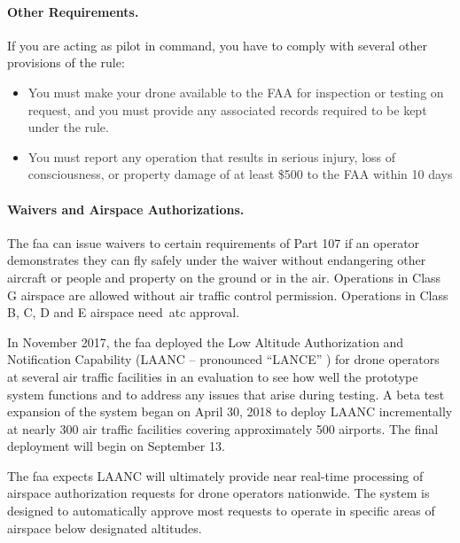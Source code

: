 \paragraph{Other Requirements.}
If you are acting as pilot in command, you have to comply with several other provisions of the rule:

\setlength{\parskip}{5.04pt}
\begin{itemize}
	\item {\fontsize{10pt}{12.0pt}\selectfont \textcolor[HTML]{333333}{You must make your drone available to the FAA for inspection or testing on request, and you must provide any associated records required to be kept under the rule.}\par}\par

	\item {\fontsize{10pt}{12.0pt}\selectfont \textcolor[HTML]{333333}{You must report any operation that results in serious injury, loss of consciousness, or property damage of at least \$500 to the FAA within 10 days}\par}
\end{itemize}\par

\paragraph{Waivers and Airspace Authorizations.}
The \gls{faa} can issue waivers to certain requirements of Part 107 if an operator demonstrates they can fly safely under the waiver without endangering other aircraft or people and property on the ground or in the air. Operations in Class G airspace are allowed without air traffic control permission. Operations in Class B, C, D and E airspace need \gls{atc} approval.

In November 2017, the \gls{faa} deployed the Low Altitude Authorization and Notification Capability (LAANC – pronounced ``LANCE'' ) for drone operators at several air traffic facilities in an evaluation to see how well the prototype system functions and to address any issues that arise during testing. A beta test expansion of the system began on April 30, 2018 to deploy LAANC incrementally at nearly 300 air traffic facilities covering approximately 500 airports. The final deployment will begin on September 13.

The \gls{faa} expects LAANC will ultimately provide near real-time processing of airspace authorization requests for drone operators nationwide. The system is designed to automatically approve most requests to operate in specific areas of airspace below designated altitudes.

